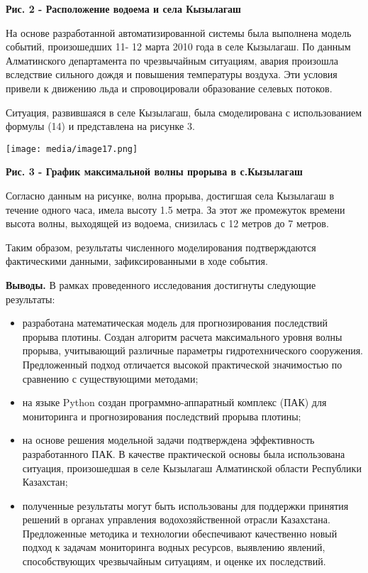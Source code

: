 \documentclass[
]{article}
\begin{document}
\textbf{Рис. 2 - Расположение водоема и села Кызылагаш}

На основе разработанной автоматизированной системы была выполнена модель
событий, произошедших 11- 12 марта 2010 года в селе Кызылагаш. По данным
Алматинского департамента по чрезвычайным ситуациям, авария произошла
вследствие сильного дождя и повышения температуры воздуха. Эти условия
привели к движению льда и спровоцировали образование селевых потоков.

Ситуация, развившаяся в селе Кызылагаш, была смоделирована с
использованием формулы (14) и представлена на рисунке 3.

\texttt{[image: media/image17.png]}

\textbf{Рис. 3 - График максимальной волны прорыва в с.Кызылагаш}

Согласно данным на рисунке, волна прорыва, достигшая села Кызылагаш в
течение одного часа, имела высоту 1.5 метра. За этот же промежуток
времени высота волны, выходящей из водоема, снизилась с 12 метров до 7
метров.

Таким образом, результаты численного моделирования подтверждаются
фактическими данными, зафиксированными в ходе события.

\textbf{Выводы.} В рамках проведенного исследования достигнуты следующие
результаты:

\begin{itemize}
\item
  разработана математическая модель для прогнозирования последствий
  прорыва плотины. Создан алгоритм расчета максимального уровня волны
  прорыва, учитывающий различные параметры гидротехнического сооружения.
  Предложенный подход отличается высокой практической значимостью по
  сравнению с существующими методами;
\item
  на языке Python создан программно-аппаратный комплекс (ПАК) для
  мониторинга и прогнозирования последствий прорыва плотины;
\item
  на основе решения модельной задачи подтверждена эффективность
  разработанного ПАК. В качестве практической основы была использована
  ситуация, произошедшая в селе Кызылагаш Алматинской области Республики
  Казахстан;
\item
  полученные результаты могут быть использованы для поддержки принятия
  решений в органах управления водохозяйственной отрасли Казахстана.
  Предложенные методика и технологии обеспечивают качественно новый
  подход к задачам мониторинга водных ресурсов, выявлению явлений,
  способствующих чрезвычайным ситуациям, и оценке их последствий.
\end{itemize}
\end{document}
